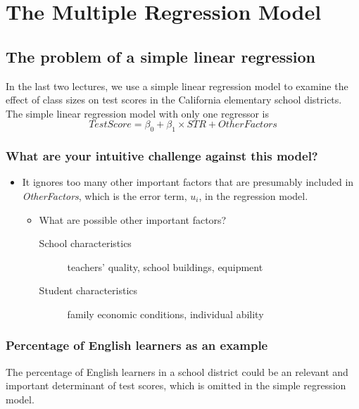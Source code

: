 \documentclass[a4paper,11pt]{article}
\begin{document}
\section{The Multiple Regression Model}
\label{sec:org7d2d480}
\subsection{The problem of a simple linear regression}
\label{sec:org8f872c4}
In the last two lectures, we use a simple linear regression model to
examine the effect of class sizes on test scores in the California
elementary school districts. The simple linear regression model with
only one regressor is
\begin{equation*}
TestScore = \beta_0 + \beta_1 \times STR + OtherFactors
\end{equation*}

\subsubsection*{What are your intuitive challenge against this model?}
\label{sec:org6f0d29e}
\begin{itemize}
\item It ignores too many other important factors that are presumably
included in \emph{OtherFactors}, which is the error term, \(u_i\), in the
regression model.
\begin{itemize}
\item What are possible other important factors?
\begin{description}
\item[{School characteristics}] teachers' quality, school buildings, equipment
\item[{Student characteristics}] family economic conditions, individual
ability
\end{description}
\end{itemize}
\end{itemize}

\subsubsection*{Percentage of English learners as an example}
\label{sec:org9dcbb4f}

The percentage of English learners in a school district could be an
relevant and important determinant of test scores, which is omitted
in the simple regression model.
\end{document}
